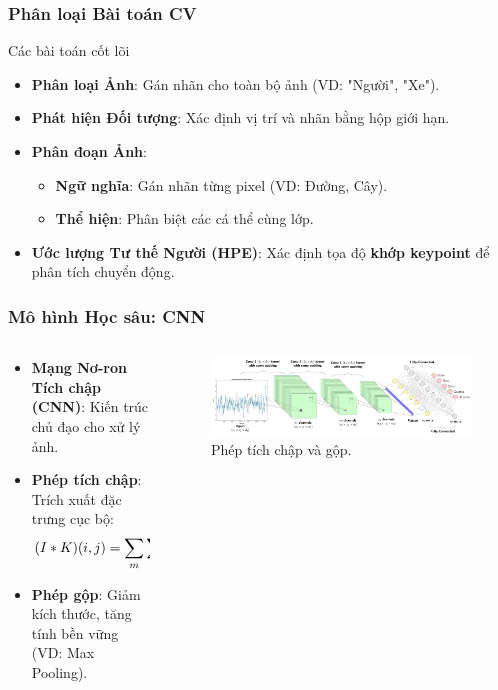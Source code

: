 \begin{frame}
\frametitle{Phân loại Bài toán CV}
\begin{block}{Các bài toán cốt lõi}
\begin{itemize}
\item \textbf{Phân loại Ảnh}: Gán nhãn cho toàn bộ ảnh (VD: "Người", "Xe").
\item \textbf{Phát hiện Đối tượng}: Xác định vị trí và nhãn bằng hộp giới hạn.
\item \textbf{Phân đoạn Ảnh}:
\begin{itemize}
\item \textbf{Ngữ nghĩa}: Gán nhãn từng pixel (VD: Đường, Cây).
\item \textbf{Thể hiện}: Phân biệt các cá thể cùng lớp.
\end{itemize}
\item \textbf{Ước lượng Tư thế Người (HPE)}: Xác định tọa độ \textbf{khớp keypoint} để phân tích chuyển động.
\end{itemize}
\end{block}
\end{frame}

\begin{frame}
\frametitle{Mô hình Học sâu: CNN}
\begin{columns}
\begin{column}{0.5\textwidth}
\begin{itemize}
\item \textbf{Mạng Nơ-ron Tích chập (CNN)}: Kiến trúc chủ đạo cho xử lý ảnh.
\item \textbf{Phép tích chập}: Trích xuất đặc trưng cục bộ:
\begin{equation}
\footnotesize
(I * K)(i, j) = \sum_{m} \sum_{n} I(i-m, j-n) K(m, n)
\end{equation}
\item \textbf{Phép gộp}: Giảm kích thước, tăng tính bền vững (VD: Max Pooling).
\end{itemize}
\end{column}

\begin{column}{0.45\textwidth}
\begin{figure}
\centering
\includegraphics[width=\textwidth]{images/2_2_convolution.jpeg}
\caption{Phép tích chập và gộp.}
\label{fig:cnn_ops}
\end{figure}
\end{column}
\end{columns}
\end{frame}

